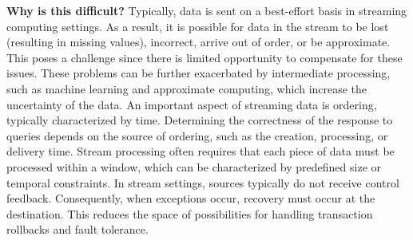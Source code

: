 
\textbf{Why is this difficult?}
Typically, data is sent on a best-effort basis in streaming computing settings. As a result, it is possible for data in the stream to be lost (resulting in missing values), incorrect, arrive out of order, or be approximate. This poses a challenge since there is limited opportunity to compensate for these issues. These problems can be further exacerbated by intermediate processing, such as machine learning and approximate computing, which increase the uncertainty of the data. An important aspect of streaming data is ordering, typically characterized by time.  Determining the correctness of the response to queries depends on the source of ordering, such as the creation, processing, or delivery time.  Stream processing often requires that each piece of data must be processed within a window, which can be characterized by predefined size or temporal constraints. In stream settings, sources typically do not receive control feedback. Consequently, when exceptions occur, recovery must occur at the destination. This reduces the space of possibilities for handling transaction rollbacks and fault tolerance.

